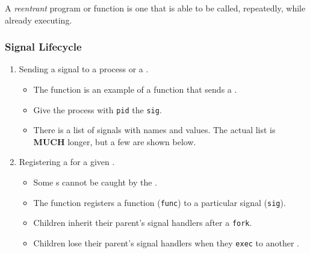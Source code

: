 \begin{definition}[Reentrant]\label{def:Reentrant}
  A \emph{reentrant} program or function is one that is able to be called, repeatedly, while already executing.
\end{definition}

\subsubsection{Signal Lifecycle}\label{subsubsec:Signal_Lifecycle}
\begin{enumerate}[noitemsep]
\item Sending a signal to a process or a .
  \begin{itemize}[noitemsep]
  \item The  function is an example of a function that sends a .
  \item Give the process with \texttt{pid} the  \texttt{sig}.
  \item There is a list of signals with names and values.
    The actual list is \textbf{MUCH} longer, but a few are shown below.
  \end{itemize}

\item Registering a  for a given .
  \begin{itemize}[noitemsep]
  \item Some s cannot be caught by the .
  \item The function  registers a function (\texttt{func}) to a particular signal (\texttt{sig}).
  \item Children inherit their parent's signal handlers after a \texttt{fork}.
  \item Children lose their parent's signal handlers when they \texttt{exec} to another .
  \end{itemize}


\end{enumerate}
